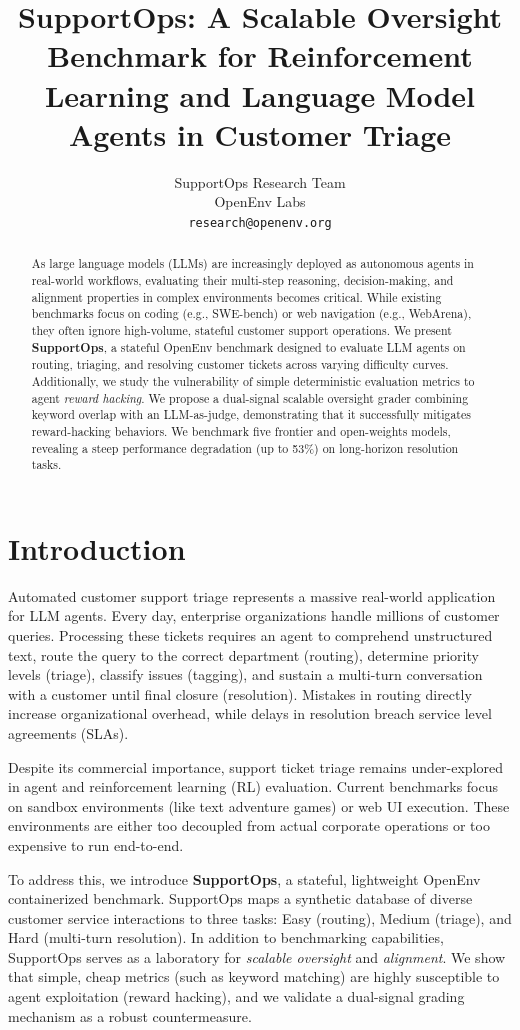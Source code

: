 \documentclass{article}
\title{SupportOps: A Scalable Oversight Benchmark for Reinforcement Learning and Language Model Agents in Customer Triage}
\author{%
  SupportOps Research Team \\
  OpenEnv Labs \\
  \texttt{research@openenv.org} \\
}
\begin{document}
\maketitle

\begin{abstract}
As large language models (LLMs) are increasingly deployed as autonomous agents in real-world workflows, evaluating their multi-step reasoning, decision-making, and alignment properties in complex environments becomes critical. While existing benchmarks focus on coding (e.g., SWE-bench) or web navigation (e.g., WebArena), they often ignore high-volume, stateful customer support operations. We present \textbf{SupportOps}, a stateful OpenEnv benchmark designed to evaluate LLM agents on routing, triaging, and resolving customer tickets across varying difficulty curves. Additionally, we study the vulnerability of simple deterministic evaluation metrics to agent \textit{reward hacking}. We propose a dual-signal scalable oversight grader combining keyword overlap with an LLM-as-judge, demonstrating that it successfully mitigates reward-hacking behaviors. We benchmark five frontier and open-weights models, revealing a steep performance degradation (up to 53\%) on long-horizon resolution tasks.
\end{abstract}

\section{Introduction}

Automated customer support triage represents a massive real-world application for LLM agents. Every day, enterprise organizations handle millions of customer queries. Processing these tickets requires an agent to comprehend unstructured text, route the query to the correct department (routing), determine priority levels (triage), classify issues (tagging), and sustain a multi-turn conversation with a customer until final closure (resolution). Mistakes in routing directly increase organizational overhead, while delays in resolution breach service level agreements (SLAs).

Despite its commercial importance, support ticket triage remains under-explored in agent and reinforcement learning (RL) evaluation. Current benchmarks focus on sandbox environments (like text adventure games) or web UI execution. These environments are either too decoupled from actual corporate operations or too expensive to run end-to-end. 

To address this, we introduce \textbf{SupportOps}, a stateful, lightweight OpenEnv containerized benchmark. SupportOps maps a synthetic database of diverse customer service interactions to three tasks: Easy (routing), Medium (triage), and Hard (multi-turn resolution). In addition to benchmarking capabilities, SupportOps serves as a laboratory for \textit{scalable oversight} and \textit{alignment}. We show that simple, cheap metrics (such as keyword matching) are highly susceptible to agent exploitation (reward hacking), and we validate a dual-signal grading mechanism as a robust countermeasure.
\end{document}
